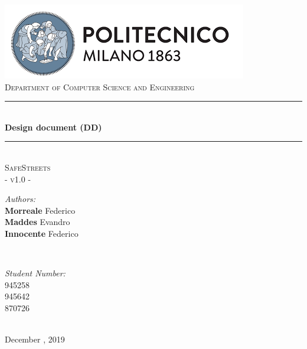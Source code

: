 \documentclass[a4paper, hidelinks, 12pt]{report}
\begin{document}
    \begin{titlepage}
        \centering
        \vspace*{0.7 cm}
        \includegraphics[scale = 0.85]{assets/polimi.png}\\[1.6 cm]
        \textsc{\large Department of Computer Science and Engineering}\\[1.8 cm]

        \rule{\linewidth}{0.2 mm} \\[0.4 cm]
        { \huge \bfseries Design document (DD)}\\
        \rule{\linewidth}{0.2 mm} \\[1.5 cm]

        \textsc{\Large SafeStreets}\\[0.5 cm]
        \textsc{\large - v1.0 -}\\[1 cm]

        \begin{minipage}{0.4\textwidth}
            \begin{flushleft} \large
            \emph{Authors:}\\
            \textbf{Morreale} Federico \\
            \textbf{Maddes} Evandro \\
            \textbf{Innocente} Federico
            \end{flushleft}
        \end{minipage}~
        \begin{minipage}{0.4\textwidth}
            \begin{flushright} \large
            \emph{Student Number:} \\
            945258 \\
            945642 \\
            870726
            \end{flushright}
        \end{minipage}\\[2 cm]
        {\large December  , 2019}\\[2 cm]

        \vfill
    \end{titlepage}

    \tableofcontents
    \newpage
    \listoftables
    \newpage
    \listoffigures
    \clearpage
    \setcounter{page}{1}

    \newpage
    
    
    
    
    
    
    
\end{document}
